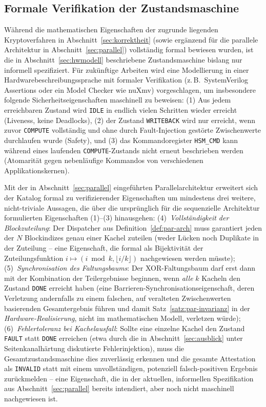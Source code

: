 ﻿\documentclass[a4paper,12pt]{article}
\theoremstyle{definition}
\begin{document}
\subsection{Formale Verifikation der Zustandsmaschine}

Während die mathematischen Eigenschaften der zugrunde liegenden Kryptoverfahren in Abschnitt~\ref{sec:korrektheit} (sowie ergänzend für die parallele Architektur in Abschnitt~\ref{sec:parallel}) vollständig formal bewiesen wurden, ist die in Abschnitt~\ref{sec:hwmodell} beschriebene Zustandsmaschine bislang nur informell spezifiziert. Für zukünftige Arbeiten wird eine Modellierung in einer Hardwarebeschreibungssprache mit formaler Verifikation (z.\,B.\ SystemVerilog Assertions oder ein Model Checker wie nuXmv) vorgeschlagen, um insbesondere folgende Sicherheitseigenschaften maschinell zu beweisen: (1) Aus jedem erreichbaren Zustand wird \texttt{IDLE} in endlich vielen Schritten wieder erreicht (Liveness, keine Deadlocks), (2) der Zustand \texttt{WRITEBACK} wird nur erreicht, wenn zuvor \texttt{COMPUTE} vollständig und ohne durch Fault-Injection gestörte Zwischenwerte durchlaufen wurde (Safety), und (3) das Kommandoregister \texttt{HSM\_CMD} kann während eines laufenden \texttt{COMPUTE}-Zustands nicht erneut beschrieben werden (Atomarität gegen nebenläufige Kommandos von verschiedenen Applikationskernen).

Mit der in Abschnitt~\ref{sec:parallel} eingeführten Parallelarchitektur erweitert sich der Katalog formal zu verifizierender Eigenschaften um mindestens drei weitere, nicht-triviale Aussagen, die über die ursprünglich für die sequenzielle Architektur formulierten Eigenschaften (1)--(3) hinausgehen: (4)~\emph{Vollständigkeit der Blockzuteilung}: Der Dispatcher aus Definition~\ref{def:par-arch} muss garantiert jeden der $N$ Blockindizes genau einer Kachel zuteilen (weder Lücken noch Duplikate in der Zuteilung -- eine Eigenschaft, die formal als Bijektivität der Zuteilungsfunktion $i \mapsto (i \bmod k, \lfloor i/k\rfloor)$ nachgewiesen werden müsste); (5)~\emph{Synchronisation des Faltungsbaums}: Der XOR-Faltungsbaum darf erst dann mit der Kombination der Teilergebnisse beginnen, wenn \emph{alle} $k$ Kacheln den Zustand \texttt{DONE} erreicht haben (eine Barrieren-Synchronisationseigenschaft, deren Verletzung andernfalls zu einem falschen, auf veralteten Zwischenwerten basierenden Gesamtergebnis führen und damit Satz~\ref{satz:par-invarianz} in der \emph{Hardware-Realisierung}, nicht im mathematischen Modell, verletzen würde); (6)~\emph{Fehlertoleranz bei Kachelausfall}: Sollte eine einzelne Kachel den Zustand \texttt{FAULT} statt \texttt{DONE} erreichen (etwa durch die in Abschnitt~\ref{sec:ausblick} unter Seitenkanalhärtung diskutierte Fehlerinjektion), muss die Gesamtzustandsmaschine dies zuverlässig erkennen und die gesamte Attestation als \texttt{INVALID} statt mit einem unvollständigen, potenziell falsch-positiven Ergebnis zurückmelden -- eine Eigenschaft, die in der aktuellen, informellen Spezifikation aus Abschnitt~\ref{sec:parallel} bereits intendiert, aber noch nicht maschinell nachgewiesen ist.
\end{document}
